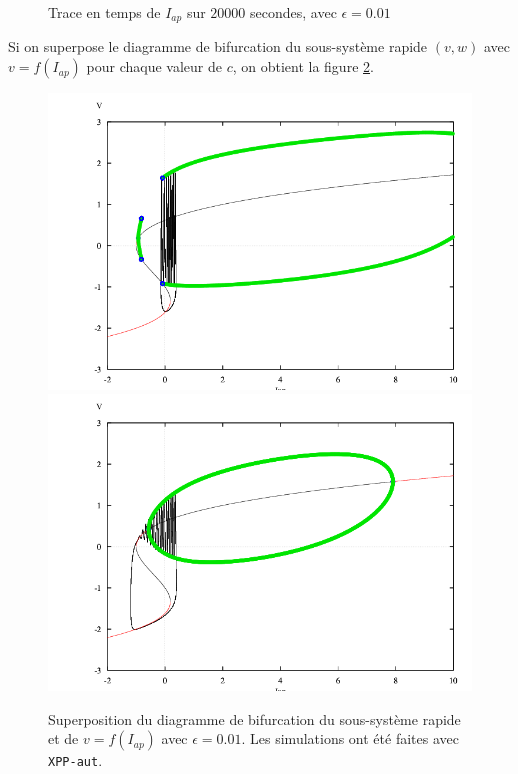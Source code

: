\documentclass[12pt,a4paper,onecolumn]{article}
\begin{document}
\begin{figure}[H]
\begin{center}
\begin{tabular}{p{}  p{}}
		\end{tabular}
	\end{center}
	\caption{Trace en temps de $I_{ap}$ sur $20000$ secondes, avec $\epsilon = 0.01$}
	\label{fig_trace_iap}
\end{figure}

Si on superpose le diagramme de bifurcation du sous-système rapide $(v,w)$ avec $v=f(I_{ap})$ pour chaque valeur de $c$, on obtient la figure \ref{super_diag}.

\begin{figure}[H]
	\begin{center}
		\includegraphics[width = 0.9\linewidth]{superpositionC1.png} \includegraphics[width = 0.9\linewidth]{superpositionC2.png}
	\end{center}
	\caption{Superposition du diagramme de bifurcation du sous-système rapide et de $v=f(I_{ap})$ avec $\epsilon = 0.01$. Les simulations ont été faites avec \texttt{XPP-aut}.}
	\label{super_diag}
\end{figure}

\printbibliography
\end{document}
